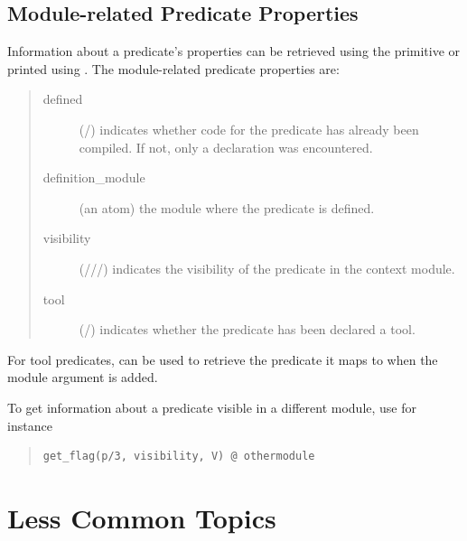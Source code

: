 \subsection{Module-related Predicate Properties}
Information about a predicate's properties can be retrieved using the
 primitive
or printed using .
The module-related predicate properties are:
\begin{quote}
\begin{description}
\item[defined]
  (/)
  indicates whether code for the predicate has already
	been compiled. If not, only a declaration was encountered.
\item[definition_module]
	(an atom) the module where the predicate is defined.
\item[visibility]
(///)
  indicates the visibility
	of the predicate in the context module.
\item[tool]
	(/) indicates whether the predicate has been
  declared a tool.
\end{description}
\end{quote}
For tool predicates,
can be used to retrieve the predicate it maps to when the module
argument is added.

To get information about a predicate visible in a different module,
use for instance
\begin{quote}
\begin{verbatim}
get_flag(p/3, visibility, V) @ othermodule
\end{verbatim}
\end{quote}

\section{Less Common Topics}


